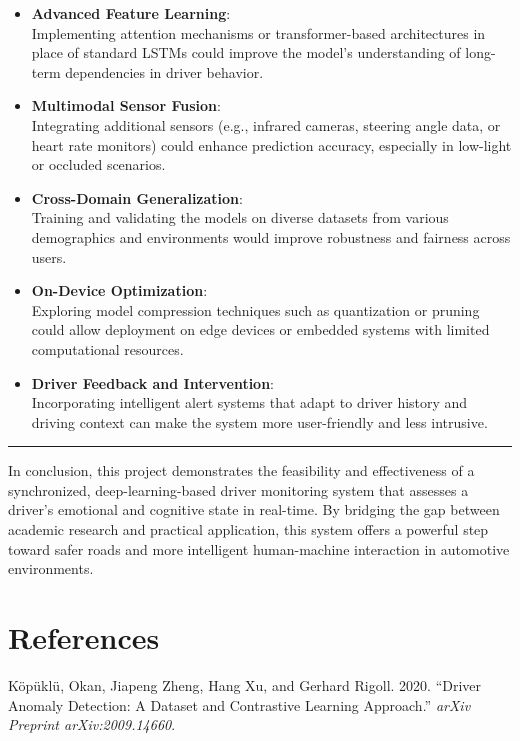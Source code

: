 \documentclass[
  letterpaper,
  DIV=11,
  numbers=noendperiod]{scrreport}
\newlength{\cslhangindent}
\newenvironment{CSLReferences}[2] %
 {\begin{list}{}{%
  \setlength{\itemindent}{0pt}
  \setlength{\leftmargin}{0pt}
  \setlength{\parsep}{0pt}
  \ifodd #1
   \setlength{\leftmargin}{\cslhangindent}
   \setlength{\itemindent}{-1\cslhangindent}
  \fi
  \setlength{\itemsep}{#2\baselineskip}}}
 {\end{list}}
\begin{document}
\begin{itemize}
\item
  \textbf{Advanced Feature Learning}:\\
  Implementing attention mechanisms or transformer-based architectures
  in place of standard LSTMs could improve the model's understanding of
  long-term dependencies in driver behavior.
\item
  \textbf{Multimodal Sensor Fusion}:\\
  Integrating additional sensors (e.g., infrared cameras, steering angle
  data, or heart rate monitors) could enhance prediction accuracy,
  especially in low-light or occluded scenarios.
\item
  \textbf{Cross-Domain Generalization}:\\
  Training and validating the models on diverse datasets from various
  demographics and environments would improve robustness and fairness
  across users.
\item
  \textbf{On-Device Optimization}:\\
  Exploring model compression techniques such as quantization or pruning
  could allow deployment on edge devices or embedded systems with
  limited computational resources.
\item
  \textbf{Driver Feedback and Intervention}:\\
  Incorporating intelligent alert systems that adapt to driver history
  and driving context can make the system more user-friendly and less
  intrusive.
\end{itemize}

\begin{center}\rule{0.5\linewidth}{0.5pt}\end{center}

In conclusion, this project demonstrates the feasibility and
effectiveness of a synchronized, deep-learning-based driver monitoring
system that assesses a driver's emotional and cognitive state in
real-time. By bridging the gap between academic research and practical
application, this system offers a powerful step toward safer roads and
more intelligent human-machine interaction in automotive environments.


\chapter*{References}\label{references}


\label{refs}
\begin{CSLReferences}{1}{0}
Köpüklü, Okan, Jiapeng Zheng, Hang Xu, and Gerhard Rigoll. 2020.
{``Driver Anomaly Detection: A Dataset and Contrastive Learning
Approach.''} \emph{arXiv Preprint arXiv:2009.14660}.

\end{CSLReferences}
\end{document}
